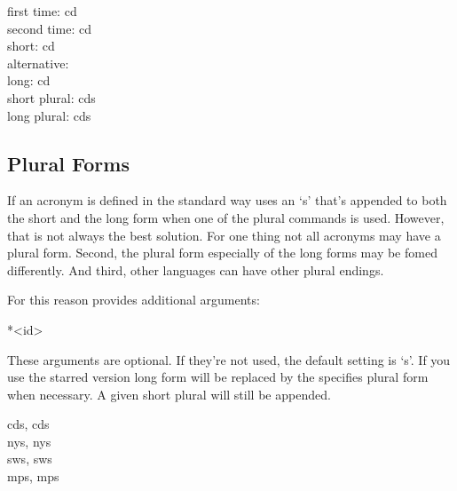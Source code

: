 \documentclass[DIV10,toc=index,toc=bib]{cnpkgdoc}
\begin{document}
\begin{beispiel}
 first time: \ac{cd} \\
 second time: \ac{cd} \\
 short: \acs{cd} \\
 alternative:  \\
 long: \acl{cd} \\
 short plural: \acsp{cd} \\
 long plural: \aclp{cd}
\end{beispiel}

\subsection{Plural Forms}
If an acronym is defined in the standard way \acro uses an `s' that's appended to
both the short and the long form when one of the plural commands is used. However,
that is not always the best solution. For one thing not all acronyms may have a
plural form. Second, the plural form especially of the long forms may be fomed
differently. And third, other languages can have other plural endings.

For this reason  provides additional arguments:
\begin{beschreibung}
 *{<id>}
\end{beschreibung}
These arguments are optional. If they're not used, the default setting is `s'.
If you use the starred version long form will be replaced by the specifies plural
form when necessary. A given short plural will still be appended.

\begin{beispiel}
 \acsp{cd}, \aclp{cd} \\
 \acsp{ny}, \aclp{ny} \\
 \acsp{sw}, \aclp{sw} \\
 \acsp{mp}, \aclp{mp}
\end{beispiel}
\end{document}
